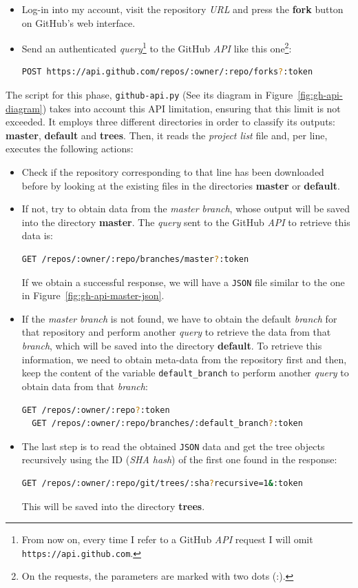 \documentclass[a4paper, 12pt]{book}
\begin{document}
\begin{itemize}
  \item Log-in into my account, visit the repository \emph{URL} and press the \textbf{fork} button on GitHub's web interface.
  \item Send an authenticated \textit{query}\footnote{From now on, every time I refer to a GitHub \textit{API}
  request I will omit \texttt{https://api.github.com}.}
  to the GitHub \textit{API} like this one\footnote{On the requests, the parameters are marked with two dots (:).}:
  \begin{lstlisting}[language=bash]
  POST https://api.github.com/repos/:owner/:repo/forks?:token \end{lstlisting}
\end{itemize}
The script for this phase, \texttt{github-api.py} (See its diagram in Figure~\ref{fig:gh-api-diagram}) takes into account
this API limitation, ensuring that this limit is not exceeded. It employs three different directories in order to classify its outputs:
\textbf{master}, \textbf{default} and \textbf{trees}.
Then, it reads the \emph{project list} file and, per line, executes the following actions:
\begin{itemize}
  \item Check if the repository corresponding to that line has been downloaded before by looking at the existing files
  in the directories \textbf{master} or \textbf{default}.
  \item If not, try to obtain data from the \emph{master} \textit{branch}, whose output will be saved into the directory
  \textbf{master}.
  The \textit{query} sent to the GitHub \textit{API} to retrieve this data is:
  \begin{lstlisting}[language=bash]
  GET /repos/:owner/:repo/branches/master?:token \end{lstlisting}
  If we obtain a successful response, we will have a \texttt{JSON} file similar to the one in Figure~\ref{fig:gh-api-master-json}.
  \item If the \emph{master} \textit{branch} is not found, we have to obtain the default \textit{branch} for that repository and
  perform another \textit{query} to retrieve the data from that \textit{branch}, which will be saved into the directory \textbf{default}.
  To retrieve this information, we need to obtain meta-data from the repository first and then, keep the content
  of the variable \texttt{default\_branch} to perform another \textit{query} to obtain data from that \textit{branch}:
  \begin{lstlisting}[language=bash]
  GET /repos/:owner/:repo?:token
  GET /repos/:owner/:repo/branches/:default_branch?:token \end{lstlisting}
  \item The last step is to read the obtained \texttt{JSON} data and get the tree objects recursively using the ID
  (\textit{SHA hash}) of the first one found in the response:
  \begin{lstlisting}[language=bash]
  GET /repos/:owner/:repo/git/trees/:sha?recursive=1&:token \end{lstlisting}
  This will be saved into the directory \textbf{trees}.
\end{itemize}
\end{document}
